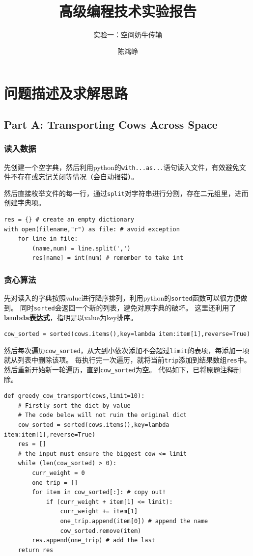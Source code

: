 \documentclass[logo,reportComp]{thesis}
\title{高级编程技术实验报告}
\subtitle{实验一：空间奶牛传输}
\author{陈鸿峥}
\begin{document}
\maketitle

\section{问题描述及求解思路}

\subsection{Part A: Transporting Cows Across Space}
\subsubsection{读入数据}
先创建一个空字典，然后利用python的\verb'with...as...'语句读入文件，有效避免文件不存在或忘记关闭等情况（会自动报错）。

然后直接枚举文件的每一行，通过\verb'split'对字符串进行分割，存在二元组里，进而创建字典项。
\begin{lstlisting}
res = {} # create an empty dictionary
with open(filename,"r") as file: # avoid exception
    for line in file:
        (name,num) = line.split(',')
        res[name] = int(num) # remember to take int
\end{lstlisting}

\subsubsection{贪心算法}
先对读入的字典按照value进行降序排列，利用python的\verb'sorted'函数可以很方便做到。
同时\verb'sorted'会返回一个新的列表，避免对原字典的破坏。
这里还利用了\textbf{lambda表达式}，指明是以value为key排序。
\begin{lstlisting}
cow_sorted = sorted(cows.items(),key=lambda item:item[1],reverse=True)
\end{lstlisting}

然后每次遍历\verb'cow_sorted'，从大到小依次添加不会超过\verb'limit'的表项，每添加一项就从列表中删除该项。
每执行完一次遍历，就将当前\verb'trip'添加到结果数组\verb'res'中。
然后重新开始新一轮遍历，直到\verb'cow_sorted'为空。
代码如下，已将原题注释删除。
\begin{lstlisting}
def greedy_cow_transport(cows,limit=10):
    # Firstly sort the dict by value
    # The code below will not ruin the original dict
    cow_sorted = sorted(cows.items(),key=lambda item:item[1],reverse=True)
    res = []
    # the input must ensure the biggest cow <= limit
    while (len(cow_sorted) > 0):
        curr_weight = 0
        one_trip = []
        for item in cow_sorted[:]: # copy out!
            if (curr_weight + item[1] <= limit):
                curr_weight += item[1]
                one_trip.append(item[0]) # append the name
                cow_sorted.remove(item)
        res.append(one_trip) # add the last
    return res
\end{lstlisting}
\end{document}
